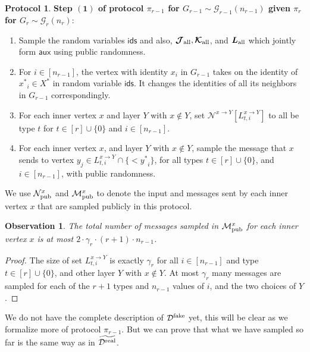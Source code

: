 \documentclass[11pt]{article}
\newtheorem{observation}[lemma]{Observation}
\theoremstyle{definition}
\newtheorem{mdprotocol}{Protocol}
\newenvironment{Protocol}{\begin{tbox}\begin{mdprotocol}}{\end{mdprotocol}\end{tbox}}
\newenvironment{tbox}{\begin{tcolorbox}[
		enlarge top by=5pt,
		enlarge bottom by=5pt,
		 breakable,
		 boxsep=0pt,
                  left=4pt,
                  right=4pt,
                  top=10pt,
                  arc=4pt,
                  boxrule=1pt,toprule=1pt,
                  colback=white
                  ]%
	}
{\end{tcolorbox}}
\newcommand{\rv}[1]{\ensuremath{{\mathsf{#1}}}\xspace}
\newcounter{mybox}
\renewcommand{\themybox}{\arabic{mybox}}
\newcommand{\namethebox}{\begin{center}\textbf{Box~\themybox} \end{center}}
\newcommand{\prot}{\ensuremath{\pi}}
\newcommand{\xstar}{\ensuremath{x^{*}}}
\newcommand{\Xstar}{\ensuremath{X^{*}}}
\newcommand{\ystar}{\ensuremath{y^{*}}}
\newcommand{\Nbhood}[3]{\ensuremath{\mathcal{N}^{#1_{#3} \to #2}}}
\newcommand{\cD}{\ensuremath{\mathcal{D}}}
\newcommand{\cG}{\ensuremath{\mathcal{G}}}
\newcommand{\cDreal}{\ensuremath{\cD^{\textnormal{real}}}}
\newcommand{\cDrealtil}{\ensuremath{\widetilde{\cDreal}}}
\newcommand{\cDfake}{\ensuremath{\cD^{\textnormal{fake}}}}
\newcommand{\raux}{\ensuremath{\rv{aux}}}
\newcommand{\Lupdown}[2]{\ensuremath{L^{#1}_{#2}}}
\newcommand{\rcJall}{\ensuremath{\bm{\mathcal{J}}_{\textnormal{all}}}}
\newcommand{\rcKall}{\ensuremath{\bm{\mathcal{K}}_{\textnormal{all}}}}
\newcommand{\rLall}{\ensuremath{\bm{L}_{\textnormal{all}}}}
\newcommand{\Npub}[1]{\ensuremath{\mathcal{N}_{\textnormal{pub}}^{#1}}}
\newcommand{\Mpub}[1]{\ensuremath{\mathcal{M}_{\textnormal{pub}}^{#1}}}
\newcommand{\rids}{\ensuremath{\rv{ids}}}
\begin{document}
\begin{Protocol}\label{box:r-1-step1-ids}
	\textbf{Step $\bm{(1)}$ of protocol $\prot_{r-1}$ for $G_{r-1} \sim \cG_{r-1}(n_{r-1})$ given $\prot_{r}$ for $G_{r} \sim \cG_r(n_r)$}:
	\begin{enumerate}[label=$(\arabic*)$]
		\item Sample the random variables $\rids$ and also, $\rcJall, \rcKall$,  and $\rLall$ which jointly form $\raux$ using public randomness. 
		\item For $i \in [n_{r-1}]$, the vertex with identity $x_i$ in $G_{r-1}$ takes on the identity of $\xstar_i \in \Xstar$ in random variable $\rids$. It changes the identities of all its neighbors in $G_{r-1}$ correspondingly.
		\item For each inner vertex $x$ and layer $Y$ with $x \notin Y$, set $\Nbhood{x}{Y}{}[\Lupdown{x \to Y}{t, i}]$ to all be type $t$ for $t \in [r] \cup \{0\}$ and $i \in [n_{r-1}]$. 
		\item For each inner vertex $x$, and layer $Y$ with $x \notin Y$, sample the message that $x$ sends to vertex $y_j \in \Lupdown{x \to Y}{t, i} \cap \{<\ystar_i\}$, for all types $t \in [r] \cup \{0\}$, and $i \in [n_{r-1}]$, with public randomness.
	\end{enumerate}
	
	We use $\Npub{x}$ and $\Mpub{x}$ to denote the input and messages sent by each inner vertex $x$ that are sampled publicly in this protocol. 
\end{Protocol}


\begin{observation}\label{obs:public-msgs-number}
	The total number of messages sampled in $\Mpub{x}$ for each inner vertex $x$ is at most $2 \cdot \gamma_r \cdot (r+1) \cdot n_{r-1}$.
\end{observation}
\begin{proof}
The size of set $\Lupdown{x \to Y}{t, i}$ is exactly $\gamma_r $ for all $i \in [n_{r-1}]$ and type $t \in [r] \cup \{0\}$, and other layer $Y$ with $x \notin Y$. At most $\gamma_r $ many messages are sampled for each of the $r+1$ types and $n_{r-1}$ values of $i$, and the two choices of $Y$.
\end{proof}

We do not have the complete description of $\cDfake$ yet, this will be clear as we formalize more of protocol $\prot_{r-1}$. But we can prove that what we have sampled so far is the same way as in $\cDrealtil$. 
\end{document}
